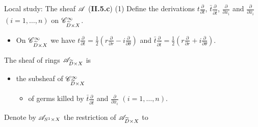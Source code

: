 \begin{frame}[t]{Local study: The sheaf $\mathscr{A}$ (\textbf{II.5.c}) (1)}
  Define the derivations
  $t\frac{\partial}{\partial t}$, $\bar t\frac{\partial}{\partial\bar t}$,
  $\frac{\partial}{\partial x_i}$ and $\frac{\partial}{\partial\bar x_i}$
  $(i=1,\dots,n)$ on $\mathscr{C}_{\widetilde D\times X}^\infty$.
  \begin{itemize}
    \item On $\mathscr{C}_{\widetilde D\times X}^\infty$ we have
        $t\frac{\partial}{\partial t}=
          \frac{1}{2}\left(r\frac{\partial}{\partial r}
          -i\frac{\partial}{\partial\theta} \right)$ and 
        $\bar t\frac{\partial}{\partial\bar t}=
          \frac{1}{2}\left(r\frac{\partial}{\partial r}
          +i\frac{\partial}{\partial\theta} \right)$.
  \end{itemize}
  \begin{defn}[II.5.10]
    The sheaf of rings $\mathscr{A}_{\widetilde D\times X}$ is
    \begin{itemize}
      \item the subsheaf of $\mathscr{C}_{\widetilde D\times X}^\infty$
        \begin{itemize}
          \item of germs killed by $\bar t\frac{\partial}{\partial\bar t}$ and
            $\frac{\partial}{\partial\bar x_i}$ $(i=1,\dots,n)$.
        \end{itemize}
    \end{itemize}
  \end{defn}
  Denote by $\mathscr{A}_{S^1\times X}$ the restriction of $\mathscr{A}_{\widetilde D\times X}$ to

\end{frame}
